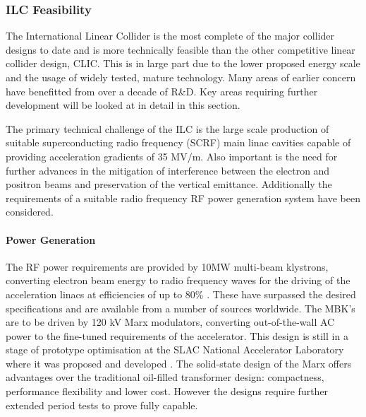 \subsubsection{ILC Feasibility}

The International Linear Collider is the most complete of the major collider designs to date and is more technically feasible than the other competitive linear collider design, CLIC. This is in large part due to the lower proposed energy scale and the usage of widely tested, mature technology. Many areas of earlier concern have benefitted from over a decade of R\&D. Key areas requiring further development will be looked at in detail in this section.

The primary technical challenge of the ILC is the large scale production of suitable superconducting radio frequency (SCRF) main linac cavities capable of providing acceleration gradients of 35 MV/m. Also important is the need for further advances in the mitigation of interference between the electron and positron beams and preservation of the vertical emittance. Additionally the requirements of a suitable radio frequency RF power generation system have been considered.

\paragraph{Power Generation}

The RF power requirements are provided by 10MW multi-beam klystrons, converting electron beam energy to radio frequency waves for the driving of the acceleration linacs at efficiencies of up to 80\% \cite{LINAC:Klystron}. These have surpassed the desired specifications and are available from a number of sources worldwide. The MBK's are to be driven by 120 kV Marx modulators, converting out-of-the-wall AC power to the fine-tuned requirements of the accelerator. This design is still in a stage of prototype optimisation at the SLAC National Accelerator Laboratory where it was proposed and developed \cite{LINAC:Marx}. The solid-state design of the Marx offers advantages over the traditional oil-filled transformer design: compactness, performance flexibility and lower cost. However the designs require further extended period tests to prove fully capable.

